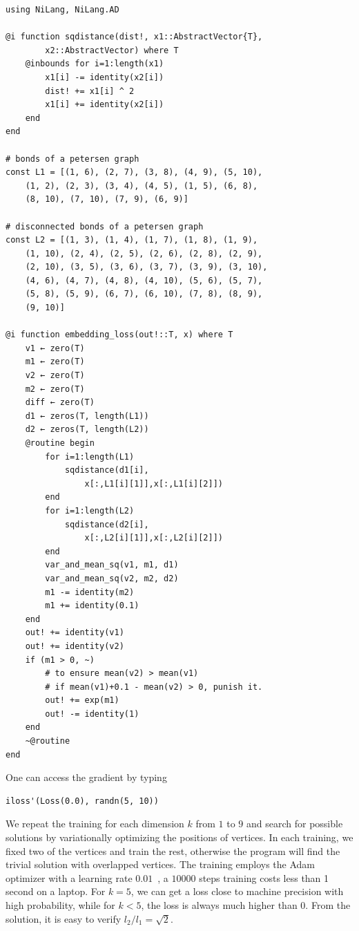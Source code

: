 \documentclass[aps,twocolumn,longbibliography,english,superscriptaddress]{revtex4-1}
\newcommand{\<}{\langle}
\renewcommand{\>}{\rangle}
\theoremstyle{definition}\newtheorem{definition}{\textit{Definition}}
\begin{document}
\begin{minipage}{.44\textwidth}
\begin{lstlisting}
using NiLang, NiLang.AD

@i function sqdistance(dist!, x1::AbstractVector{T},
        x2::AbstractVector) where T
    @inbounds for i=1:length(x1)
        x1[i] -= identity(x2[i])
        dist! += x1[i] ^ 2
        x1[i] += identity(x2[i])
    end
end

# bonds of a petersen graph
const L1 = [(1, 6), (2, 7), (3, 8), (4, 9), (5, 10),
    (1, 2), (2, 3), (3, 4), (4, 5), (1, 5), (6, 8),
    (8, 10), (7, 10), (7, 9), (6, 9)]

# disconnected bonds of a petersen graph
const L2 = [(1, 3), (1, 4), (1, 7), (1, 8), (1, 9),
    (1, 10), (2, 4), (2, 5), (2, 6), (2, 8), (2, 9),
    (2, 10), (3, 5), (3, 6), (3, 7), (3, 9), (3, 10),
    (4, 6), (4, 7), (4, 8), (4, 10), (5, 6), (5, 7),
    (5, 8), (5, 9), (6, 7), (6, 10), (7, 8), (8, 9),
    (9, 10)]

@i function embedding_loss(out!::T, x) where T
    v1 ← zero(T)
    m1 ← zero(T)
    v2 ← zero(T)
    m2 ← zero(T)
    diff ← zero(T)
    d1 ← zeros(T, length(L1))
    d2 ← zeros(T, length(L2))
    @routine begin
        for i=1:length(L1)
            sqdistance(d1[i], 
                x[:,L1[i][1]],x[:,L1[i][2]])
        end
        for i=1:length(L2)
            sqdistance(d2[i],
                x[:,L2[i][1]],x[:,L2[i][2]])
        end
        var_and_mean_sq(v1, m1, d1)
        var_and_mean_sq(v2, m2, d2)
        m1 -= identity(m2)
        m1 += identity(0.1)
    end
    out! += identity(v1)
    out! += identity(v2)
    if (m1 > 0, ~)
        # to ensure mean(v2) > mean(v1)
        # if mean(v1)+0.1 - mean(v2) > 0, punish it.
        out! += exp(m1)
        out! -= identity(1)
    end
    ~@routine
end
\end{lstlisting}
\end{minipage}

One can access the gradient by typing

\begin{minipage}{.44\textwidth}
\begin{lstlisting}
iloss'(Loss(0.0), randn(5, 10))
\end{lstlisting}
\end{minipage}

We repeat the training for each dimension $k$ from $1$ to $9$ and search for possible solutions by variationally optimizing the positions of vertices.
In each training, we fixed two of the vertices and train the rest, otherwise the program will find the trivial solution with overlapped vertices. 
The training employs the Adam optimizer with a learning rate $0.01$~\cite{Kingma2014}, a $10000$ steps training costs less than 1 second on a laptop. For $k=5$, we can get a loss close to machine precision with high probability, while for $k < 5$, the loss is always much higher than $0$.
From the solution, it is easy to verify $l_2/l_1 = \sqrt{2}$.
\end{document}
